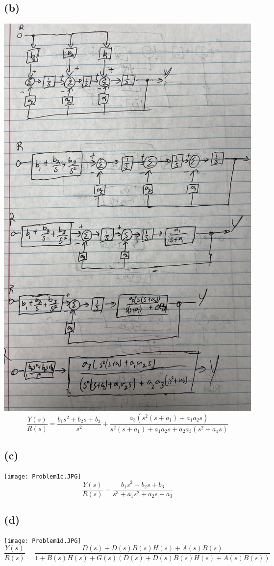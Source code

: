 \documentclass[12pt]{article}
\begin{document}
\subsection*{(b)}
\includegraphics[scale=0.5]{Problem1b.JPG}
\FloatBarrier
$$\frac{Y(s)}{R(s)}=\boxed{\frac{b_1s^2+b_2s+b_3}{s^2}+
\frac{a_3(s^2(s+a_1)+a_1a_2s)}{s^2(s+a_1)+a_1a_2s+a_2a_3(s^2+a_1s)}}$$

\subsection*{(c)}
\texttt{[image: Problem1c.JPG]}
\FloatBarrier
$$\frac{Y(s)}{R(s)}=\boxed{\frac{b_1s^2+b_2s+b_3}{s^3+a_1s^2+a_2s+a_3}}$$
\subsection*{(d)}
\texttt{[image: Problem1d.JPG]}
\FloatBarrier
$$\frac{Y(s)}{R(s)}=\boxed{\frac{D(s)+D(s)B(s)H(s)+A(s)B(s)}
{1+B(s)H(s)+G(s)(D(s)+D(s)B(s)H(s)+A(s)B(s))}}$$
\end{document}
